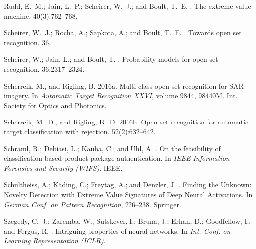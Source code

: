 \documentclass[letterpaper]{article}
\begin{document}
\begin{thebibliography}{}
Rudd, E.~M.; Jain, L.~P.; Scheirer, W.~J.; and Boult, T.~E.
.
\newblock The extreme value machine.
  40(3):762--768.

Scheirer, W.~J.; Rocha, A.; Sapkota, A.; and Boult, T.~E.
.
\newblock Towards open set recognition.
 36.

Scheirer, W.; Jain, L.; and Boult, T.
.
\newblock Probability models for open set recognition.
 36:2317--2324.

Scherreik, M., and Rigling, B.
\newblock 2016a.
\newblock Multi-class open set recognition for {SAR} imagery.
\newblock In {\em Automatic {Target} {Recognition} {XXVI}}, volume 9844,
  98440M.
\newblock Int. Society for Optics and Photonics.

Scherreik, M.~D., and Rigling, B.~D.
\newblock 2016b.
\newblock Open set recognition for automatic target classification with
  rejection.
 52(2):632--642.

Schraml, R.; Debiasi, L.; Kauba, C.; and Uhl, A.
.
\newblock On the feasibility of classification-based product package
  authentication.
\newblock In {\em IEEE Information {Forensics} and {Security} ({WIFS})}.
\newblock IEEE.

Schultheiss, A.; Käding, C.; Freytag, A.; and Denzler, J.
.
\newblock Finding the {Unknown}: {Novelty} {Detection} with {Extreme} {Value}
  {Signatures} of {Deep} {Neural} {Activations}.
\newblock In {\em German {Conf.} on {Pattern} {Recognition}},  226--238.
\newblock Springer.

Szegedy, C.~J.; Zaremba, W.; Sutskever, I.; Bruna, J.; Erhan, D.; Goodfellow,
  I.; and Fergus, R.
.
\newblock Intriguing properties of neural networks.
\newblock In {\em Int. Conf. on Learning Representation (ICLR)}.


\end{thebibliography}
\end{document}

